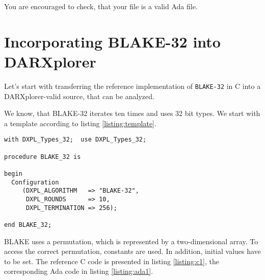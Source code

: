 \documentclass{acmtrans2m}
\begin{document}
You are encouraged to check, that your file is a valid Ada file.

\vfill

\section{Incorporating BLAKE-32 into DARXplorer}
Let's start with transferring the reference implementation of \texttt{BLAKE-32} in C into
a DARXplorer-valid source, that can be analyzed.

We know, that BLAKE-32 iterates ten times and uses 32 bit types. We
start with a template according to listing \ref{listing:template}.

\begin{lstlisting}[caption=DARXplorer template,label=listing:template]
with DXPL_Types_32;  use DXPL_Types_32;

procedure BLAKE_32 is

begin
  Configuration
     (DXPL_ALGORITHM   => "BLAKE-32",
      DXPL_ROUNDS      => 10,
      DXPL_TERMINATION => 256);

end BLAKE_32;
\end{lstlisting}

BLAKE uses a permutation, which is represented by a two-dimensional array.
To access the correct permutation, constants are used. In addition, initial values
have to be set. The reference C code is presented in listing \ref{listing:c1},
the corresponding Ada code in listing \ref{listing:ada1}.
\end{document}
